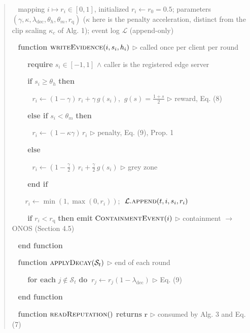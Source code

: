 \documentclass[cmc,article,submit,moreauthors,pdftex]{Definitions/tsp}
\begin{document}
\begin{quote}
\noindent{}~ mapping $i \mapsto r_i \in [0,1]$, initialized $r_i \leftarrow r_0 = 0.5$; parameters $(\gamma, \kappa, \lambda_{\mathrm{dec}}, \theta_h, \theta_m, r_{\mathrm{q}})$  ($\kappa$ here is the penalty acceleration, distinct from the clip scaling $\kappa_c$ of Alg. 1); event log $\mathcal{L}$ (append-only)

\noindent{}~ \textbf{function} $\textsc{writeEvidence}(i, s_i, h_i)$  $\triangleright$ called once per client per round

\noindent{}~ $\quad$ \textbf{require} $s_i \in [-1, 1]$ $\wedge$ caller is the registered edge server

\noindent{}~ $\quad$ \textbf{if} $s_i \geq \theta_h$ \textbf{then}

\noindent{}~ $\quad\quad r_i \leftarrow (1-\gamma)\, r_i + \gamma\, g(s_i)$, $\ g(s) = \tfrac{1+s}{2}$  $\triangleright$ reward, Eq. (8)

\noindent{}~ $\quad$ \textbf{else if} $s_i < \theta_m$ \textbf{then}

\noindent{}~ $\quad\quad r_i \leftarrow (1 - \kappa\gamma)\, r_i$  $\triangleright$ penalty, Eq. (9), Prop. 1

\noindent{}~ $\quad$ \textbf{else}

\noindent{}~ $\quad\quad r_i \leftarrow (1 - \tfrac{\gamma}{2})\, r_i + \tfrac{\gamma}{2}\, g(s_i)$  $\triangleright$ grey zone

\noindent{}~ $\quad$ \textbf{end if}

\noindent{}~ $\quad r_i \leftarrow \min(1, \max(0, r_i))$; $\ \mathcal{L}.\textsc{append}(t, i, s_i, r_i)$

\noindent{}~ $\quad$ \textbf{if} $r_i < r_{\mathrm{q}}$ \textbf{then emit} $\textsc{ContainmentEvent}(i)$  $\triangleright$ containment $\rightarrow$ ONOS (Section 4.5)

\noindent{}~ \textbf{end function}

\noindent{}~ \textbf{function} $\textsc{applyDecay}(\mathcal{S}_t)$  $\triangleright$ end of each round

\noindent{}~ $\quad$ \textbf{for each} $j \notin \mathcal{S}_t$ \textbf{do} $\ r_j \leftarrow r_j (1 - \lambda_{\mathrm{dec}})$  $\triangleright$ Eq. (9)

\noindent{}~ \textbf{end function}

\noindent{}~ \textbf{function} $\textsc{readReputation}()$ \textbf{returns} $\mathbf{r}$  $\triangleright$ consumed by Alg. 3 and Eq. (7)
\end{quote}
\end{document}
